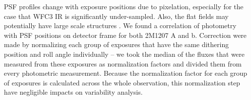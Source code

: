 \documentclass[apj]{emulateapj}
\begin{document}
PSF profiles change with exposure positions due to
pixelation, especially for the case that WFC3 IR is significantly
under-sampled. Also, the flat fields may potentially have large scale
structures \citep{dressel2012wide}. We found a correlation of
photometry with PSF positions on detector frame for both 2M1207 A and
b. Correction were made by normalizing each group of
exposures that have the same dithering position and roll angle
individually -- we took the median of the fluxes that were measured
from these exposures as normalization factors and divided them from
every photometric measurement. Because the normalization factor for
each group of exposures is calculated across the whole observation,
this normalization step have negligible impacts on variability
analysis.


\end{document}
